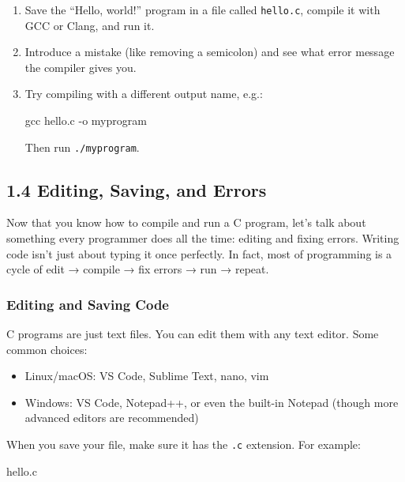\documentclass[
  letterpaper,
  DIV=11,
  numbers=noendperiod]{scrreprt}
\newenvironment{Shaded}{\begin{snugshade}}{\end{snugshade}}
\newcommand{\AttributeTok}[1]{\textcolor[rgb]{0.40,0.45,0.13}{#1}}
\newcommand{\ExtensionTok}[1]{\textcolor[rgb]{0.00,0.23,0.31}{#1}}
\newcommand{\FunctionTok}[1]{\textcolor[rgb]{0.28,0.35,0.67}{#1}}
\newcommand{\NormalTok}[1]{\textcolor[rgb]{0.00,0.23,0.31}{#1}}
\providecommand{\tightlist}{%
  \setlength{\itemsep}{0pt}\setlength{\parskip}{0pt}}
\begin{document}
\begin{enumerate}
\def\labelenumi{\arabic{enumi}.}
\item
  Save the ``Hello, world!'' program in a file called \texttt{hello.c},
  compile it with GCC or Clang, and run it.
\item
  Introduce a mistake (like removing a semicolon) and see what error
  message the compiler gives you.
\item
  Try compiling with a different output name, e.g.:

\begin{Shaded}
\begin{Highlighting}[]
\FunctionTok{gcc}\NormalTok{ hello.c }\AttributeTok{{-}o}\NormalTok{ myprogram}
\end{Highlighting}
\end{Shaded}

  Then run \texttt{./myprogram}.
\end{enumerate}

\subsection{1.4 Editing, Saving, and
Errors}\label{editing-saving-and-errors}

Now that you know how to compile and run a C program, let's talk about
something every programmer does all the time: editing and fixing errors.
Writing code isn't just about typing it once perfectly. In fact, most of
programming is a cycle of edit → compile → fix errors → run → repeat.

\subsubsection{Editing and Saving Code}\label{editing-and-saving-code}

C programs are just text files. You can edit them with any text editor.
Some common choices:

\begin{itemize}
\tightlist
\item
  Linux/macOS: VS Code, Sublime Text, nano, vim
\item
  Windows: VS Code, Notepad++, or even the built-in Notepad (though more
  advanced editors are recommended)
\end{itemize}

When you save your file, make sure it has the \texttt{.c} extension. For
example:

\begin{Shaded}
\begin{Highlighting}[]
\ExtensionTok{hello.c}
\end{Highlighting}
\end{Shaded}
\end{document}
